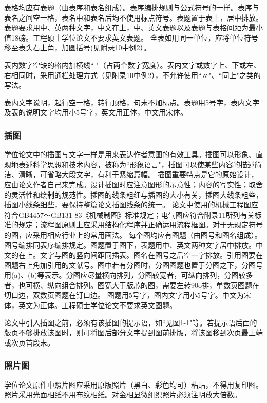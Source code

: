 表格均应有表题（由表序和表名组成）。表序编排规则与公式符号的一样。表序与表名之间空一格，表名中和表名后均不使用标点符号。表题置于表上，居中排放。表题要求用中、英两种文字，中文在上，中、英文表题以及表题与表格间距为最小值18磅。工程硕士学位论文不要求英文表题。
全表如用同一单位，应将单位符号移至表头右上角，加圆括号(见附录10中例2）。

表内数字空缺的格内加横线``-"（占两个数字宽度）。表内文字或数字上、下或左、右相同时，采用通栏处理方式（见附录10中例2），不允许使用``〃"、``同上"之类的写法。

表内文字说明，起行空一格，转行顶格，句末不加标点。表题用5号字，表内文字及表的说明文字均用小5号字，英文用正体，中文用宋体。

\subsubsection{插图}\label{appendixA-6-2-10} 
学位论文中的插图与文字一样是用来表达作者意图的有效工具。插图可以形象、直观地表述科学思想和技术内容，被称为``形象语言"，插图可以使某些内容的描述简洁、清晰，可省略大段文字，有利于紧缩篇幅。
插图重要特点是它的原始设计，应由论文作者自己来完成。设计插图时应注意图形的示意性；内容的写实性；取舍的灵活性和绘制的规范性。插图的线条粗细与插图的大小有关，插图大线条粗些，插图小线条细些，要保持整篇论文插图线条的统一。
论文中使用的机械工程图应符合GB4457～GB131-83《机械制图》标准规定；电气图应符合附录11所列有关标准的规定；流程图原则上应采用结构化程序并正确运用流程框图。对于无规定符号的图，应采用相应行业上的常用画法。
每个图均应有图题（由图号和图名组成）。图号编排同表序编排规定。图题置于图下，表题用中、英文两种文字居中排放。中文的在上。文字与图的竖向间距同插表。图名在图号之后空一字排放。引用图要在图题右上角加引用的文献号。图中若有分图时，分图图题也置于分图之下，分图号用(a)、(b)等表示。分图应尽量横向排列，分图较宽者，可纵向排列，分图较多者，也可横、纵向组合排列。图宽大于版芯的图，需要左转90o排，单数页图题在切口边，双数页图题在钉口边。
图题用5号字，图内文字用小5号字。中文为宋体，英文为正体。工程硕士学位论文不要求英文图题。

论文中引入插图之前，必须有该插图的提示语，如``见图1-1"等。若提示语后面的版页不够排放该图时，则可将图后部分文字提到图前排版，将该图移到次页最上端或次页首段末。


\subsubsection{照片图}\label{appendixA-6-2-11} 
学位论文原件中照片图应采用原版照片（黑白、彩色均可）粘贴，不得用复印图。照片采用光面相纸不用布纹相纸。对金相显微组织照片必须注明放大倍数。

